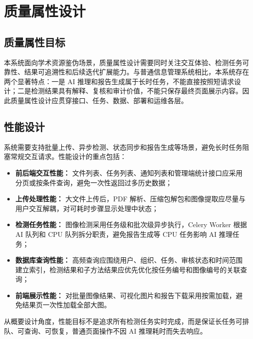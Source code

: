 \section{质量属性设计}

\subsection{质量属性目标}
本系统面向学术资源鉴伪场景，质量属性设计需要同时关注交互体验、检测任务可靠性、结果可追溯性和后续迭代扩展能力。与普通信息管理系统相比，本系统存在两个显著特点：一是 AI 推理和报告生成属于长时任务，不能直接按照短请求设计；二是检测结果具有解释、复核和审计价值，不能只保存最终页面展示内容。因此质量属性设计应贯穿接口、任务、数据、部署和运维各层。

\subsection{性能设计}
系统需要支持批量上传、异步检测、状态同步和报告生成等场景，避免长时任务阻塞常规交互请求。性能设计的重点包括：
\begin{itemize}[leftmargin=2em]
    \item \textbf{前后端交互性能：} 文件列表、任务列表、通知列表和管理端统计接口应采用分页或按条件查询，避免一次性返回过多历史数据；
    \item \textbf{上传处理性能：} 大文件上传后，PDF 解析、压缩包解包和图像提取应尽量与用户交互解耦，对可耗时步骤显示处理中状态；
    \item \textbf{检测任务性能：} 图像检测采用任务级和批次级异步执行，Celery Worker 根据 AI 队列和 CPU 队列拆分职责，避免报告生成等 CPU 任务影响 AI 推理任务；
    \item \textbf{数据库查询性能：} 高频查询应围绕用户、组织、任务、审核状态和时间范围建立索引，检测结果和子方法结果应优先优化按任务编号和图像编号的关联查询；
    \item \textbf{前端展示性能：} 对批量图像结果、可视化图片和报告下载采用按需加载，避免结果页一次性加载全部大图。
\end{itemize}

从概要设计角度，性能目标不是追求所有检测任务实时完成，而是保证长任务可排队、可查询、可恢复，普通页面操作不因 AI 推理耗时而失去响应。

